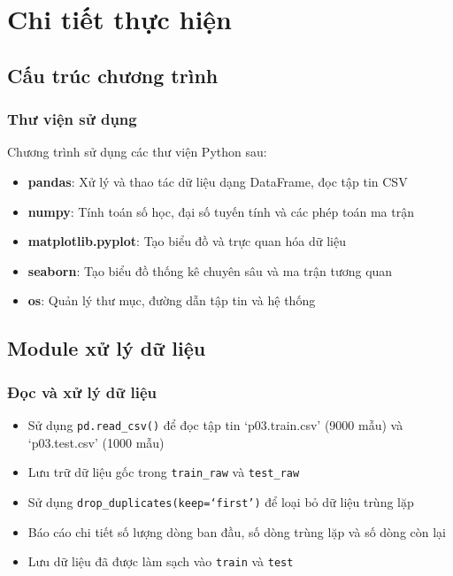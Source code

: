 \section{Chi tiết thực hiện}

\subsection{Cấu trúc chương trình}

\subsubsection{Thư viện sử dụng}
Chương trình sử dụng các thư viện Python sau:
\begin{itemize}
	\item \textbf{pandas}: Xử lý và thao tác dữ liệu dạng DataFrame, đọc tập tin CSV
	\item \textbf{numpy}: Tính toán số học, đại số tuyến tính và các phép toán ma trận
	\item \textbf{matplotlib.pyplot}: Tạo biểu đồ và trực quan hóa dữ liệu
	\item \textbf{seaborn}: Tạo biểu đồ thống kê chuyên sâu và ma trận tương quan
	\item \textbf{os}: Quản lý thư mục, đường dẫn tập tin và hệ thống
\end{itemize}

\subsection{Module xử lý dữ liệu}

\subsubsection{Đọc và xử lý dữ liệu}
\begin{itemize}
	\item Sử dụng \texttt{pd.read\_csv()} để đọc tập tin `p03.train.csv' (9000 mẫu) và `p03.test.csv' (1000 mẫu)
	\item Lưu trữ dữ liệu gốc trong \texttt{train\_raw} và \texttt{test\_raw}
	\item Sử dụng \texttt{drop\_duplicates(keep=`first')} để loại bỏ dữ liệu trùng lặp
	\item Báo cáo chi tiết số lượng dòng ban đầu, số dòng trùng lặp và số dòng còn lại
	\item Lưu dữ liệu đã được làm sạch vào \texttt{train} và \texttt{test}
\end{itemize}

